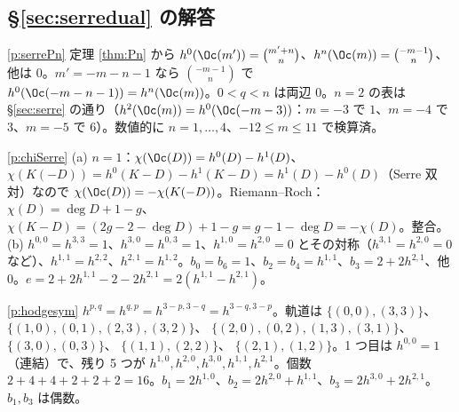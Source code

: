 \subsection*{\S\ref{sec:serredual} の解答}
\begin{sol}{\ref{p:serrePn}}
定理 \ref{thm:Pn} から $h^0(\Oc(m'))=\binom{m'+n}n$、$h^n(\Oc(m))=\binom{-m-1}n$、他は $0$。$m'=-m-n-1$ なら $\binom{-m-1}n$ で $h^0(\Oc(-m-n-1))=h^n(\Oc(m))$。$0<q<n$ は両辺 $0$。$n=2$ の表は \S\ref{sec:serre} の通り（$h^2(\Oc(m))=h^0(\Oc(-m-3))$：$m=-3$ で $1$、$m=-4$ で $3$、$m=-5$ で $6$）。数値的に $n=1,\ldots,4$、$-12\le m\le11$ で検算済。
\end{sol}
\begin{sol}{\ref{p:chiSerre}}
(a) $n=1$：$\chi(\Oc(D))=h^0(D)-h^1(D)$、$\chi(K(-D))=h^0(K-D)-h^1(K-D)=h^1(D)-h^0(D)$（Serre 双対）なので $\chi(\Oc(D))=-\chi(K(-D))$。Riemann--Roch：$\chi(D)=\deg D+1-g$、$\chi(K-D)=(2g-2-\deg D)+1-g=g-1-\deg D=-\chi(D)$。整合。(b) $h^{0,0}=h^{3,3}=1$、$h^{3,0}=h^{0,3}=1$、$h^{1,0}=h^{2,0}=0$ とその対称（$h^{3,1}=h^{2,0}=0$ など）、$h^{1,1}=h^{2,2}$、$h^{2,1}=h^{1,2}$。$b_0=b_6=1$、$b_2=b_4=h^{1,1}$、$b_3=2+2h^{2,1}$、他 $0$。$e=2+2h^{1,1}-2-2h^{2,1}=2(h^{1,1}-h^{2,1})$。
\end{sol}
\begin{sol}{\ref{p:hodgesym}}
$h^{p,q}=h^{q,p}=h^{3-p,3-q}=h^{3-q,3-p}$。軌道は $\{(0,0),(3,3)\}$、 $\{(1,0),(0,1),(2,3),(3,2)\}$、 $\{(2,0),(0,2),(1,3),(3,1)\}$、 $\{(3,0),(0,3)\}$、 $\{(1,1),(2,2)\}$、 $\{(2,1),(1,2)\}$。1 つ目は $h^{0,0}=1$（連結）で、残り 5 つが $h^{1,0},h^{2,0},h^{3,0},h^{1,1},h^{2,1}$。個数 $2+4+4+2+2+2=16$。$b_1=2h^{1,0}$、$b_2=2h^{2,0}+h^{1,1}$、$b_3=2h^{3,0}+2h^{2,1}$。$b_1,b_3$ は偶数。
\end{sol}

